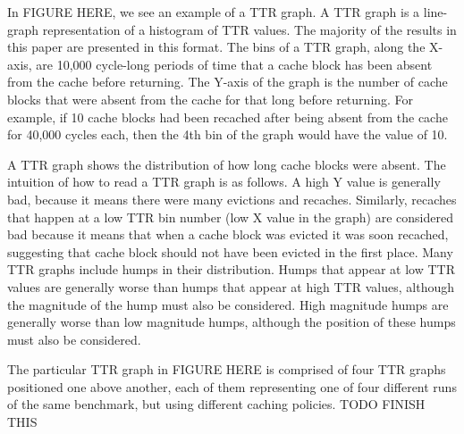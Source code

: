 In FIGURE HERE, we see an example of a TTR graph.  A TTR graph is a
line-graph representation of a histogram of TTR values.  The majority
of
the results in this paper are presented in this format.  The bins of a
TTR graph, along the X-axis,  are 10,000 cycle-long periods of time
that a cache block has
been absent from the cache before returning.  The Y-axis of the graph
is the number of cache blocks that were absent from the cache for that
long before returning.  For example, if 10 cache blocks had been
recached after being absent from the cache for 40,000 cycles each,
then the 4th bin of the graph would have the value of 10.

A TTR graph shows the distribution of how long cache blocks were
absent.  The intuition of how to read a TTR graph is as follows.  A
high Y value is generally bad, because it means there were many
evictions
and recaches.  Similarly, recaches that happen at a low TTR bin number
(low X value in the graph) are considered bad because it means that
when a cache block was evicted it was soon recached, suggesting that
cache block should not have been evicted in the first place.  Many TTR
graphs include humps in their distribution.  Humps that appear at low
TTR values are generally worse than humps that appear at high TTR
values, although the magnitude of the hump must also be considered.
High magnitude humps are generally worse than low magnitude humps,
although the position of these humps must also be considered.

The particular TTR graph in FIGURE HERE is comprised of four TTR
graphs positioned one above another, each of them representing one of
four different runs of the same benchmark, but using different caching
policies.  TODO FINISH THIS
